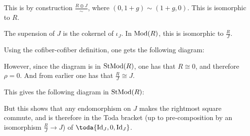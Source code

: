 This is by construction \( \frac{R \oplus J}{\sim} \), where \( (0, 1+g) \sim (1+g, 0) \). This is isomorphic to \( R \).

The supension of \( J \) is the cokernel of \( \iota_J \). In \( \operatorname{Mod}(R) \), this is isomorphic to \( \frac{R}{J} \).

Using the cofiber-cofiber definition, one gets the following diagram:

\begin{center}
\end{center}

However, since the diagram is in \( \operatorname{StMod}(R) \), one has that \( R \cong 0 \), and therefore \( \rho = 0 \). And from earlier one has that \( \frac{R}{J} \cong J \).

This gives the following diagram in \( \operatorname{StMod}(R) \):

\begin{center}
\end{center}

But this shows that any endomorphism on \( J \) makes the rightmost square commute, and is therefore in the Toda bracket (up to pre-composition by an isomorphism \( \frac{R}{J} \to J \)) of \( \toda{\Id_J, 0, \Id_J} \). 

